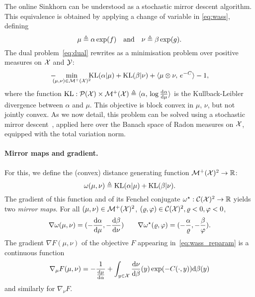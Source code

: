 The online Sinkhorn can be understood as a stochastic mirror descent algorithm.
%
This equivalence is obtained by applying a change
of variable in \eqref{eq:wass}, defining 
\begin{equation}\label{eq-change-var}
	\mu \triangleq \alpha \exp(f)
	\quad \text{and} \quad 
	\nu \triangleq \beta \exp(g). 
\end{equation}
The dual problem~\eqref{eq:dual} 
rewrites as a minimisation problem over positive measures on $\mathcal{X}$ and $\mathcal{Y}$:
\begin{equation}\label{eq:wass_reparam}
    - \!\!\!\!\min_{(\mu,\nu) \in \mathcal{M}^+(\mathcal{X})^2} \!\!\!\textrm{KL}(\alpha | \mu)
    + \textrm{KL}(\beta | \nu) + \langle \mu \otimes \nu,\,e^{-C}\rangle - 1,
\end{equation}
where the function $\textrm{KL}: \mathcal{P}(\mathcal{X}) \times \mathcal{M}^+(\mathcal{X}) \triangleq \langle \alpha,\, \log \frac{\textrm{d} \alpha}{\textrm{d} \mu}\rangle$ is the Kullback-Leibler divergence between
$\alpha$ and $\mu$. 
%
This objective is block convex in $\mu$, $\nu$, but not jointly convex. 
%
As we now detail, this problem can be solved using a stochastic mirror descent~\citep{beck2003mirror}, applied here over the Banach space of Radon measures on $\mathcal{X}$, equipped with the total variation norm. 

\paragraph{Mirror maps and gradient.}

For this, we define the (convex) distance generating function $\mathcal{M}^+(\mathcal{X})^2 \to \mathbb{R}$:
\begin{equation}
    \omega(\mu, \nu) \triangleq \textrm{KL}(\alpha | \mu) + \textrm{KL}(\beta | \nu).
\end{equation}
The gradient of this function and of its Fenchel conjugate $\omega^\star:
\mathcal{C}(\mathcal{X})^2 \to \mathbb{R}$ yields two \textit{mirror maps}. For all $(\mu, \nu) \in
\mathcal{M}^+(\mathcal{X})^2$, $(\varrho, \varphi) \in \mathcal{C}(\mathcal{X})^2, \varrho < 0, \varphi < 0$,
\begin{equation}
    \nabla \omega(\mu, \nu) = (- \frac{\textrm{d} \alpha}{\textrm{d} \mu}, - \frac{\textrm{d} \beta}{\textrm{d} \nu} )
    \qquad \nabla \omega^\star(\varrho, \varphi)
     = (-\frac{\alpha}{\varrho}, -\frac{\beta}{\varphi}).
\end{equation}
The gradient $\nabla F(\mu, \nu)$ of the objective $F$ appearing
in~\eqref{eq:wass_reparam} is a continuous function
\begin{equation}
    \nabla_\mu F(\mu, \nu) = - \frac{1}{\frac{\textrm{d}\mu}{\textrm{d}\alpha}} + \int_{y \in \mathcal{X}}
    \frac{\textrm{d} \nu}{\textrm{d} \beta}(y) \exp(- C(\cdot, y)) \textrm{d} \beta(y)
\end{equation}
and similarly for $\nabla_\nu F$.

